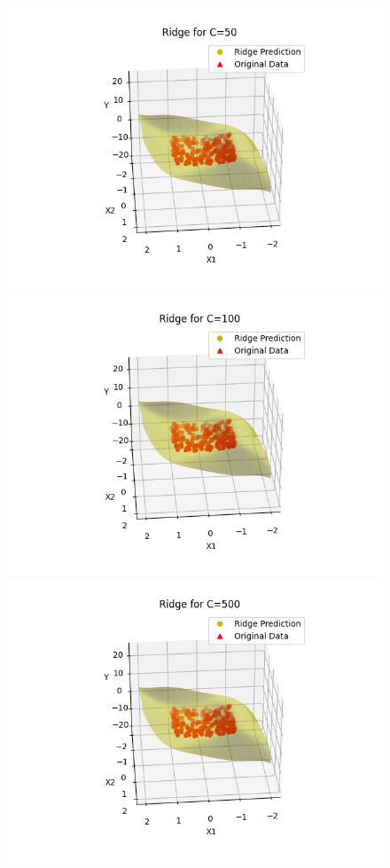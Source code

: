 \documentclass[10pt]{article}
\begin{document}
\begin{figure}[H]
\begin{center}
    \includegraphics[scale=0.4]{./images/Figure_3_50.png}
    \includegraphics[scale=0.4]{./images/Figure_3_100.png}
    \includegraphics[scale=0.4]{./images/Figure_3_500.png}

\end{center}
\end{figure}
\end{document}
